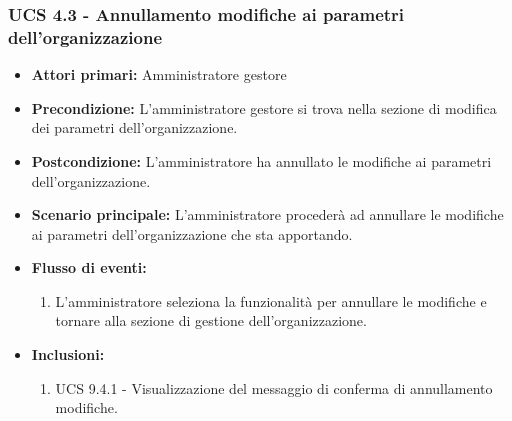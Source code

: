 \subsubsection{UCS 4.3 - Annullamento modifiche ai parametri dell'organizzazione}%
\begin{itemize}
\item \textbf{Attori primari:} Amministratore gestore
\item \textbf{Precondizione:} L'amministratore gestore si trova nella sezione di modifica dei parametri dell'organizzazione.
\item \textbf{Postcondizione:} L'amministratore ha annullato le modifiche ai parametri dell'organizzazione.
\item \textbf{Scenario principale:} L'amministratore procederà ad annullare le modifiche ai parametri dell'organizzazione che sta apportando.
\item \textbf{Flusso di eventi:}
\begin{enumerate}
    \item L'amministratore seleziona la funzionalità per annullare le modifiche e tornare alla sezione di gestione dell'organizzazione.
\end{enumerate}
\item \textbf{Inclusioni:}
\begin{enumerate}
    \item UCS 9.4.1 - Visualizzazione del messaggio di conferma di annullamento modifiche.
\end{enumerate}
\end{itemize}